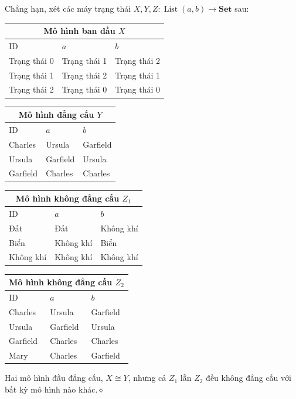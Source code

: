Chẳng hạn, xét các máy trạng thái $X,Y,Z:\operatorname{List}(a,b)\to\mathbf{Set}$ sau:
\begin{center}\footnotesize\setlength{\tabcolsep}{4pt}
\begin{tabular}{|l|l|l|}\hline\multicolumn{3}{|c|}{Mô hình ban đầu $X$}\\\hline ID&$a$&$b$\\\hline Trạng thái 0&Trạng thái 1&Trạng thái 2\\Trạng thái 1&Trạng thái 2&Trạng thái 1\\Trạng thái 2&Trạng thái 0&Trạng thái 0\\\hline\end{tabular}\quad
\begin{tabular}{|l|l|l|}\hline\multicolumn{3}{|c|}{Mô hình đẳng cấu $Y$}\\\hline ID&$a$&$b$\\\hline Charles&Ursula&Garfield\\Ursula&Garfield&Ursula\\Garfield&Charles&Charles\\\hline\end{tabular}

\medskip
\begin{tabular}{|l|l|l|}\hline\multicolumn{3}{|c|}{Mô hình không đẳng cấu $Z_1$}\\\hline ID&$a$&$b$\\\hline Đất&Đất&Không khí\\Biển&Không khí&Biển\\Không khí&Không khí&Không khí\\\hline\end{tabular}\quad
\begin{tabular}{|l|l|l|}\hline\multicolumn{3}{|c|}{Mô hình không đẳng cấu $Z_2$}\\\hline ID&$a$&$b$\\\hline Charles&Ursula&Garfield\\Ursula&Garfield&Ursula\\Garfield&Charles&Charles\\Mary&Charles&Garfield\\\hline\end{tabular}
\end{center}
Hai mô hình đầu đẳng cấu, $X\cong Y$, nhưng cả $Z_1$ lẫn $Z_2$ đều không đẳng cấu với bất kỳ mô hình nào khác.\hfill$\diamond$
